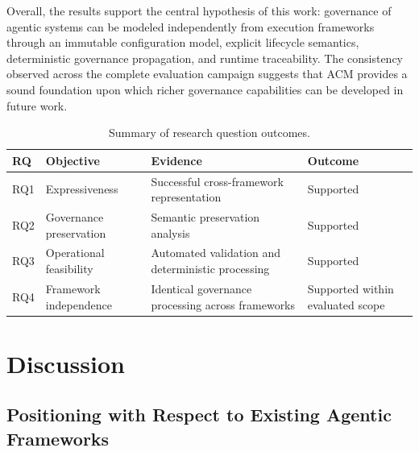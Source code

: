\documentclass[10pt]{article}
\begin{document}
Overall, the results support the central hypothesis of this work: governance of
agentic systems can be modeled independently from execution frameworks through
an immutable configuration model, explicit lifecycle semantics, deterministic
governance propagation, and runtime traceability. The consistency observed
across the complete evaluation campaign suggests that ACM provides a sound
foundation upon which richer governance capabilities can be developed in future
work.

\begin{table}[ht]

\centering

\caption{Summary of research question outcomes.}

\label{tab:rq_summary}

\begin{tabular}{p{1cm}p{2.7cm}p{5cm}p{2cm}}

\toprule

\textbf{RQ} &
\textbf{Objective} &
\textbf{Evidence} &
\textbf{Outcome}

\\

\midrule

RQ1 &
Expressiveness &
Successful cross-framework representation &
Supported

\\

RQ2 &
Governance preservation &
Semantic preservation analysis &
Supported

\\

RQ3 &
Operational feasibility &
Automated validation and deterministic processing &
Supported

\\

RQ4 &
Framework independence &
Identical governance processing across frameworks &
Supported within evaluated scope

\\

\bottomrule

\end{tabular}

\end{table}

\section{Discussion}
\label{sec:discussion}
\subsection{Positioning with Respect to Existing Agentic Frameworks}
\label{sec:positioning}
\end{document}
